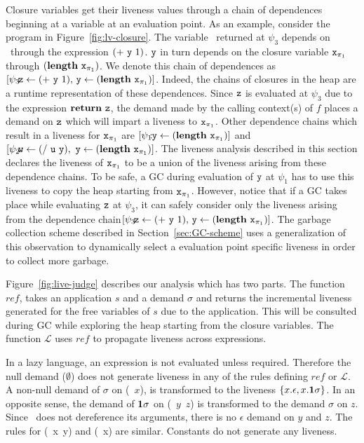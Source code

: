 \documentclass[9pt]{sigplanconf}
\begin{document}
 
Closure  variables get  their  liveness values  through  a chain  of
dependences beginning at  a variable at an evaluation  point.  As an
example, consider the program in Figure~\ref{fig:lv-closure}.
The variable  \pz\ returned  at $\psi_3$ depends  on \py\  through the
expression $(+~\mbox{\tt y}~1)$.  $\mbox{\tt y}$ in turn depends on the closure variable
$\mbox{\tt x}_{\mathit{\pi}_1}$  through $(\mathbf{length}~\mbox{\tt x}_{\mathit{\pi}_1})$.   We
denote this  chain of  dependences as  $\lbrack \psi_3\!\!\!:\!\!\!\mbox{\tt z}
\leftarrow            (+~\mbox{\tt y}~1),\,           \mbox{\tt y}            \leftarrow
(\mathbf{length}~\mbox{\tt x}_{\mathit{\pi}_1})\rbrack$.  Indeed,  the chains of closures  in the
heap are a  runtime representation of these  dependences.  Since $\mbox{\tt z}$
is evaluated  at $\psi_3$  due to  the expression  $\mbox{$\mathbf{ return}$}~\mbox{\tt z}$, the
demand made by the calling context(s)  of $f$ places a demand on $\mbox{\tt z}$
which  will  impart a  liveness  to  $\mbox{\tt x}_{\pi_1}$.  Other  dependence
chains  which result  in  a liveness  for  $\mbox{\tt x}_{\pi_1}$ are  $\lbrack
\psi_1\!\!\!:\!\!\mbox{\tt y}   \leftarrow  (\mathbf{length}~\mbox{\tt x}_{\pi_1})\rbrack$   and
$\lbrack   \psi_2\!\!\!:\!\!\!\mbox{\tt w}   \leftarrow  (/~\mbox{\tt u}~\mbox{\tt y}),\,\,   \mbox{\tt y}
\leftarrow   (\mathbf{length}~\mbox{\tt x}_{\pi_1})\rbrack$.   The   liveness  analysis
described in this section declares the liveness of $\mbox{\tt x}_{\pi_1}$ to be
a union of  the liveness arising from these dependence  chains.  To be
safe, a GC during  evaluation of $\mbox{\tt y}$ at $\psi_1$ has
to use  this liveness to  copy the heap starting from  $\mbox{\tt x}_{\pi_1}$.  However,
notice that if a GC takes place while evaluating $\mbox{\tt z}$
at $\psi_3$, it can safely consider only the liveness arising from the
dependence chain\linebreak  $\lbrack \psi_3\!\!\!:\!\!\!\mbox{\tt z} \leftarrow
(+~\mbox{\tt y}~1),\, \mbox{\tt y} \leftarrow (\mathbf{length}~\mbox{\tt x}_{\pi_1})\rbrack$.  The garbage
collection  scheme  described  in Section~\ref{sec:GC-scheme}  uses  a
generalization of this observation  to dynamically select a evaluation
point specific liveness in order to collect more garbage.



Figure~\ref{fig:live-judge}  describes  our  analysis  which  has  two
parts. The  function $\mathit{ref}$,  takes an  application $s$  and a
demand $\sigma$ and returns the incremental liveness generated for the
free variables of $s$ due to  the application.  This will be consulted
during GC  while exploring the heap  starting from the
closure  variables.  The function $\mathcal{L}$  uses  $\mathit{ref}$ to  propagate
liveness across expressions.

In  a   lazy  language,   an  expression   is  not   evaluated  unless
required. Therefore  the null  demand ($\emptyset$) does  not generate
liveness in any of the rules defining $\mathit{ref}$ or $\mathcal{L}$.
A non-null  demand of  $\sigma$ on (\CDR~$x$),  is transformed  to the
liveness $\{x.\epsilon,  x.\mathbf{1}\sigma\}$.  In an opposite  sense, the
demand  of  $\mathbf{1}\sigma$ on  (\CONS~$y$~$z$)  is  transformed to  the
demand  $\sigma$  on  $z$.   Since \CONS\  does  not  dereference  its
arguments, there  is no $\epsilon$ demand  on $y$ and $z$.   The rules
for (\PRIM~x~y) and (\NULLQ~x) are  similar. Constants do not generate
any liveness.
\end{document}
